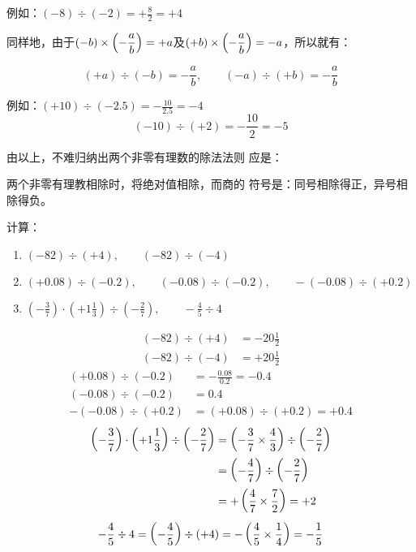 例如：$(-8)\div (-2)=+\frac{8}{2}=+4$

同样地，由于$(-b)\times \left(-\dfrac{a}{b}\right)=+a$及$(+b)\times \left(-\dfrac{a}{b}\right)=-a$，所以就有：

\[(+a)\div (-b)=-\frac{a}{b},\qquad   (-a)\div (+b)=-\frac{a}{b}\]

例如：$(+10)\div (-2.5)=-\frac{10}{2.5}=-4$
\[(-10)\div (+2)=-\frac{10}{2}=-5 \]

由以上，不难归纳出两个非零有理数的除法法则
应是：

\begin{blk}{}
    两个非零有理教相除时，将绝对值相除，而商的
符号是：同号相除得正，异号相除得负。
\end{blk}
    
\begin{example}
计算：
\begin{enumerate}
    \item $(-82)\div (+4),\qquad (-82)\div (-4)$
    \item $(+0.08)\div (-0.2),\qquad (-0.08)\div (-0.2),\qquad -(-0.08)\div (+0.2)$
    \item $\left(-\frac{3}{7}\right)\cdot \left(+1\frac{1}{3}\right)\div \left(-\frac{2}{7}\right),\qquad -\frac{4}{5}\div 4$
\end{enumerate}
\end{example}

\begin{solution}
\[\begin{split}
    (-82)\div (+4)&=-20\frac{1}{2}\\
    (-82)\div (-4)&=+20\frac{1}{2}
\end{split}\]
\[\begin{split}
    (+0.08)\div (-0.2)&=-\frac{0.08}{0.2}=-0.4\\
    (-0.08)\div (-0.2)&=0.4\\
    -(-0.08)\div (+0.2)&=(+0.08)\div (+0.2)=+0.4
\end{split}\]
\[\begin{split}
    \left(-\dfrac{3}{7}\right)\cdot \left(+1\dfrac{1}{3}\right)\div \left(-\dfrac{2}{7}\right)&= \left(-\dfrac{3}{7}\times\dfrac{4}{3}\right) \div \left(-\dfrac{2}{7}\right)\\
    &=\left(-\dfrac{4}{7}\right)\div \left(-\dfrac{2}{7}\right)\\
    &=+\left(\dfrac{4}{7}\times\dfrac{7}{2}\right)=+2
\end{split}\]
\[-\dfrac{4}{5}\div 4=\left(-\dfrac{4}{5}\right)\div (+4)=-\left(\dfrac{4}{5}\times\dfrac{1}{4}\right)=-\dfrac{1}{5} \]
\end{solution}

